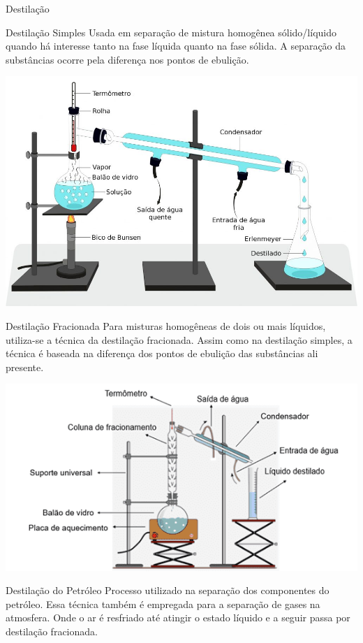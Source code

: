 \documentclass{beamer}
\begin{document}
\begin{frame}[label={sec:orge5cbe24}]{Destilação}
\begin{block}{Destilação Simples}
Usada em separação  de mistura homogênea sólido/líquido quando há interesse tanto na fase líquida quanto na fase sólida. A separação da substâncias ocorre pela diferença nos pontos de ebulição.

\begin{center}
\includegraphics[scale=0.3]{../img/destilacao-simples.jpg}
\end{center}
\end{block}
\begin{block}{Destilação Fracionada}
Para misturas homogêneas de dois ou mais líquidos, utiliza-se a técnica da destilação fracionada. Assim como na destilação simples, a técnica é baseada na diferença dos pontos de ebulição das substâncias ali presente. 

\begin{center}
\includegraphics[scale=0.5]{../img/destilacao-fracionada.png}
\end{center}
\end{block}
\begin{block}{Destilação do Petróleo}
Processo utilizado na separação dos componentes do petróleo. Essa técnica também é empregada para a separação de gases na atmosfera. Onde o ar é resfriado até atingir o estado líquido e a seguir passa por \alert{destilação fracionada}.


\end{block}
\end{frame}
\end{document}
